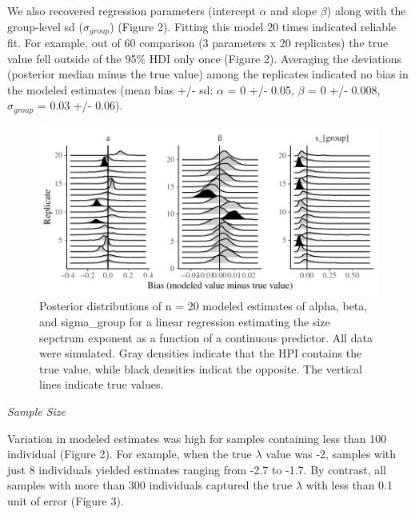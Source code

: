 \documentclass[
  12pt,
]{article}
\begin{document}
We also recovered regression parameters (intercept \(\alpha\) and slope
\(\beta\)) along with the group-level sd (\(\sigma_{group}\)) (Figure
2). Fitting this model 20 times indicated reliable fit. For example, out
of 60 comparison (3 parameters x 20 replicates) the true value fell
outside of the 95\% HDI only once (Figure 2). Averaging the deviations
(posterior median minus the true value) among the replicates indicated
no bias in the modeled estimates (mean bias +/- sd: \(\alpha\) = 0 +/-
0.05, \(\beta\) = 0 +/- 0.008, \(\sigma_{group}\) = 0.03 +/- 0.06).

\begin{figure}
\centering
\includegraphics{stan_spectra_manuscript_update_files/figure-latex/unnamed-chunk-3-1.pdf}
\caption{Posterior distributions of n = 20 modeled estimates of alpha,
beta, and sigma\_group for a linear regression estimating the size
sepctrum exponent as a function of a continuous predictor. All data were
simulated. Gray densities indicate that the HPI contains the true value,
while black densities indicat the opposite. The vertical lines indicate
true values.}
\end{figure}

\emph{Sample Size}

Variation in modeled estimates was high for samples containing less than
100 individual (Figure 2). For example, when the true \(\lambda\) value
was -2, samples with just 8 individuals yielded estimates ranging from
-2.7 to -1.7. By contrast, all samples with more than 300 individuals
captured the true \(\lambda\) with less than 0.1 unit of error (Figure
3).
\end{document}

